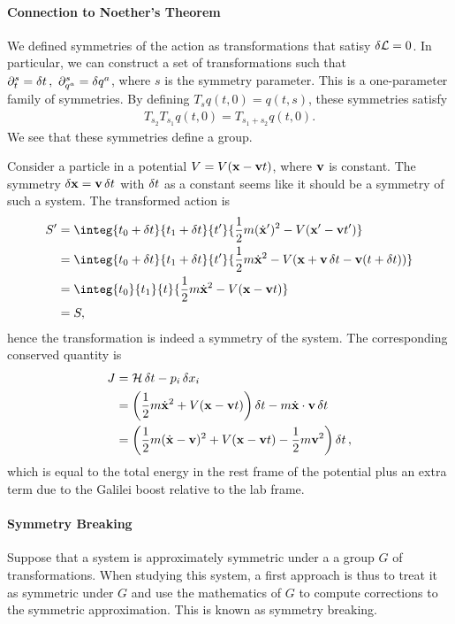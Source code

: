\paragraph{Connection to Noether's Theorem}
We defined symmetries of the action as transformations that satisy $\var{\ensuremath{\mathcal{L}}} = 0$. In particular, we can construct a set of transformations such that $\partial^{s}_{t} = \var{t},\ \partial^{s}_{q^{a}} = \var{q^{a}}$, where $s$ is the symmetry parameter. This is a one-parameter family of symmetries. By defining $T_{s}q(t, 0) = q(t, s)$, these symmetries satisfy
\begin{align*}
T_{s_{2}}T_{s_{1}}q(t, 0) = T_{s_{1} + s_{2}}q(t, 0).
\end{align*}
We see that these symmetries define a group.

Consider a particle in a potential $V = V(\vb{x} - \vb{v}t)$, where $\vb{v}$ is constant. The symmetry $\var{\vb{x}} = \vb{v}\var{t}$ with $\var{t}$ as a constant seems like it should be a symmetry of such a system. The transformed action is
\begin{align*}
	S^{\prime} &= \integ{t_{0} + \var{t}}{t_{1} + \var{t}}{t^{\prime}}{\frac{1}{2}m(\dot{\vb{x}}^{\prime})^{2} - V(\vb{x}^{\prime} - \vb{v}t^{\prime})} \\
	           &= \integ{t_{0} + \var{t}}{t_{1} + \var{t}}{t^{\prime}}{\frac{1}{2}m\dot{\vb{x}}^{2} - V(\vb{x} + \vb{v}\var{t} - \vb{v}(t + \var{t}))} \\
	           &= \integ{t_{0}}{t_{1}}{t}{\frac{1}{2}m\dot{\vb{x}}^{2} - V(\vb{x} - \vb{v}t)} \\
	           &= S,
\end{align*}
hence the transformation is indeed a symmetry of the system. The corresponding conserved quantity is
\begin{align*}
	J &= \mathcal{H}\var{t} - p_{i}\var{x}_{i} \\
	  &= \left(\frac{1}{2}m\dot{\vb{x}}^{2} + V(\vb{x} - \vb{v}t)\right)\var{t} - m\dot{\vb{x}}\cdot\vb{v}\var{t} \\
	  &= \left(\frac{1}{2}m(\dot{\vb{x}} - \vb{v})^{2} + V(\vb{x} - \vb{v}t) - \frac{1}{2}m\vb{v}^{2}\right)\var{t},
\end{align*}
which is equal to the total energy in the rest frame of the potential plus an extra term due to the Galilei boost relative to the lab frame.

\paragraph{Symmetry Breaking}
Suppose that a system is approximately symmetric under a a group $G$ of transformations. When studying this system, a first approach is thus to treat it as symmetric under $G$ and use the mathematics of $G$ to compute corrections to the symmetric approximation. This is known as symmetry breaking.

